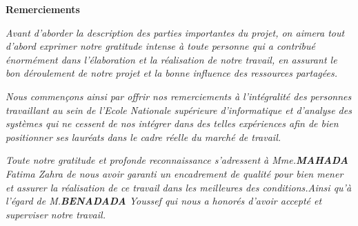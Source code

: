 \documentclass[a4paper,12pt]{report}
\begin{document}
 \setcounter{page}{1}
\begin{doublespace}
\begin{center}
\vspace*{1cm}

\textbf{\huge{Remerciements}}

\end{center}
\end{doublespace}
\begin{doublespace}
\begin{center}

\textit{Avant d'aborder la description des parties importantes du projet, on aimera tout d’abord exprimer notre gratitude intense à toute personne qui a contribué  énormément dans l'élaboration et la réalisation de notre travail, en assurant le bon déroulement de notre projet et la bonne influence des ressources partagées.}

\textit{Nous commençons ainsi par offrir nos remerciements à l'intégralité des personnes travaillant au sein de l’Ecole Nationale supérieure d’informatique et d’analyse des systèmes qui ne cessent de nos intégrer dans des telles expériences afin de bien positionner ses lauréats dans le cadre réelle du marché de travail.}

\textit{Toute notre gratitude et profonde reconnaissance s’adressent à  Mme.\textbf{MAHADA} Fatima Zahra  de nous avoir garanti un encadrement de qualité pour bien mener et assurer la réalisation de ce travail dans les meilleures des conditions.Ainsi qu'à l'égard de M.\textbf{BENADADA} Youssef qui nous a honorés d’avoir accepté et superviser notre travail.}

\end{center}

\end{doublespace}
\end{document}
